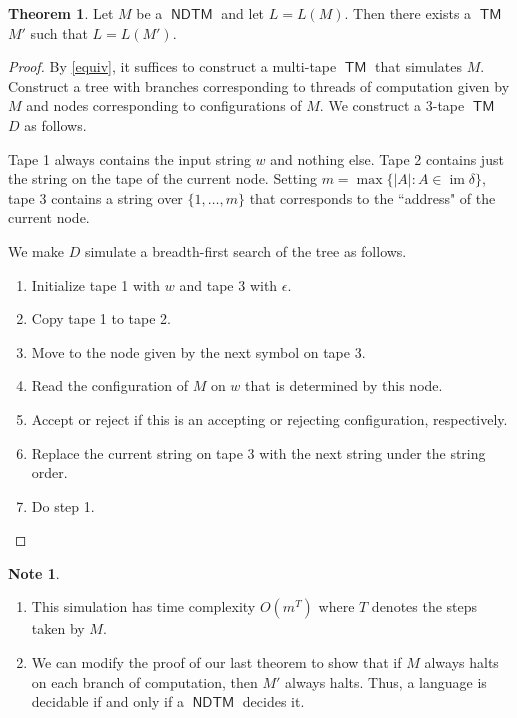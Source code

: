 \documentclass[10pt,letterpaper,cm]{nupset}
\theoremstyle{definition}
\newtheorem{note}[definition]{Note}
\theoremstyle{theorem}
\newtheorem{theorem}[definition]{Theorem}
\theoremstyle{remark}
\newcommand{\1}{\mathbf{1}}
\newcommand{\0}{\vec 0}
\DeclareMathOperator{\im}{im}
\DeclareMathOperator{\TM}{\mathsf{TM}}
\DeclareMathOperator{\NDTM}{\mathsf{NDTM}}
\begin{document}
\begin{theorem}
Let $M$ be a $\NDTM$ and let $L = L(M)$. Then there exists a $\TM$ $M'$ such that $L= L(M')$. 
\end{theorem}
\begin{proof}
By \cref{equiv}, it suffices to construct a multi-tape $\TM$ that simulates $M$. Construct a tree with branches corresponding to threads of computation given by $M$ and nodes corresponding to configurations of $M$. We construct a $3$-tape $\TM$ $D$ as follows. 

\medskip

 Tape 1 always contains the input string $w$ and nothing else. Tape 2 contains just the string on the tape of the current node. Setting $m = \max\{ |A| : A \in \im{\delta} \}$, tape 3 contains a string over $\{1, \ldots, m\}$ that corresponds to the ``address" of the current node. 

\medskip

 We make $D$ simulate a breadth-first search of the tree as follows. 
\begin{enumerate}
\item Initialize  tape 1 with $w$ and tape $3$ with $\epsilon$. 
\item Copy tape 1 to tape 2.
\item Move to the node given by the next symbol on tape 3.
\item Read the configuration of $M$ on $w$ that is determined by this node.
\item Accept or reject if this is an accepting or rejecting configuration, respectively. 
\item Replace the current string on tape 3 with the next string under the string order.
\item Do step 1.
\end{enumerate}
\end{proof}

\begin{note} $ $
\begin{enumerate}
\item This simulation has time complexity $O(m^T)$ where $T$ denotes the steps taken by $M$.
\item We can modify the proof of our last theorem to show that if $M$ always halts on each branch of computation, then $M'$ always halts. Thus, a language is decidable if and only if a $\NDTM$ decides it.
\end{enumerate}
\end{note}
\end{document}
